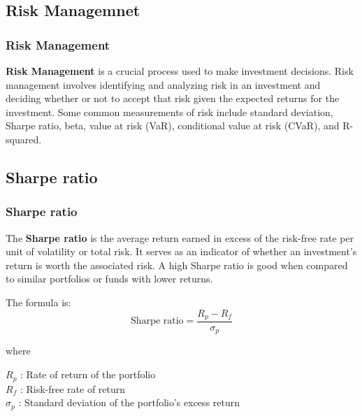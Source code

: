 \documentclass{beamer}
\begin{document}
\subsection{Risk Managemnet}

\begin{frame}
\frametitle{\textbf{Risk Management}}

\begin{definition}
\justifying
\textbf{Risk Management} is a crucial process used to make investment decisions. Risk management involves identifying and analyzing risk in an investment and deciding whether or not to accept that risk given the expected returns for the investment. Some common measurements of risk include standard deviation, Sharpe ratio, beta, value at risk (VaR), conditional value at risk (CVaR), and R-squared.
\end{definition}


\end{frame}







\subsection{Sharpe ratio}

\begin{frame}
\frametitle{\textbf{Sharpe ratio}}


\vspace{0.6cm}
\begin{definition}
\justifying
The \textbf{Sharpe ratio} is the average return earned in excess of the risk-free rate per unit of volatility or total risk. It serves as an indicator of whether an investment's return is worth the associated risk. A high Sharpe ratio is good when compared to similar portfolios or funds with lower returns.
\end{definition}

\begin{block}
\justifying
The formula is:
$$
\text{Sharpe ratio} = \frac{R_{p} - R_{f}}{\sigma_{p}}
$$
\end{block}

\vspace{0.2cm}
\justifying
where

\vspace{0.2cm}
\justifying
$R_{p}$ : Rate of return of the portfolio\\
$R_{f}$ : Risk-free rate of return\\
$\sigma_{p}$ : Standard deviation of the portfolio's excess return


\end{frame}
\end{document}
